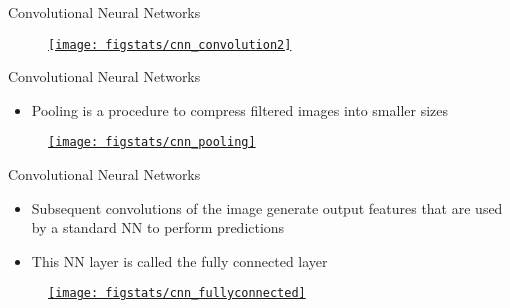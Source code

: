 \documentclass[handout,9pt]{beamer}
\begin{document}
\begin{frame}{Convolutional Neural Networks}


\begin{figure}[!htb]
    \centering
		\href{https://towardsdatascience.com/a-comprehensive-guide-to-convolutional-neural-networks-the-eli5-way-3bd2b1164a53}{\texttt{[image: figstats/cnn\_convolution2]}}
\end{figure}

\end{frame}

\begin{frame}{Convolutional Neural Networks}

\begin{itemize}
\item Pooling is a procedure to compress filtered images into smaller sizes
\end{itemize}

\begin{figure}[!htb]
    \centering
		\href{https://towardsdatascience.com/a-comprehensive-guide-to-convolutional-neural-networks-the-eli5-way-3bd2b1164a53}{\texttt{[image: figstats/cnn\_pooling]}}
\end{figure}

\end{frame}

\begin{frame}{Convolutional Neural Networks}

\begin{itemize}
   \setlength{\itemsep}{10pt}
\item Subsequent convolutions of the image generate output features that are used by a standard NN to perform predictions
\item This NN layer is called the fully connected layer
\end{itemize}

\begin{figure}[!htb]
    \centering
		\href{https://towardsdatascience.com/a-comprehensive-guide-to-convolutional-neural-networks-the-eli5-way-3bd2b1164a53}{\texttt{[image: figstats/cnn\_fullyconnected]}}
\end{figure}

\end{frame}
\end{document}
